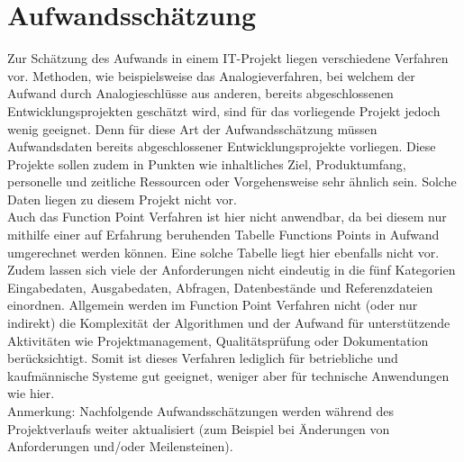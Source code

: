 \documentclass[../review_1.tex]{subfiles}
\begin{document}
\chapter{Aufwandsschätzung}\thispagestyle{fancy} %
Zur Schätzung des Aufwands in einem IT-Projekt liegen verschiedene Verfahren vor. Methoden, wie beispielsweise das Analogieverfahren, bei welchem der Aufwand durch Analogieschlüsse aus anderen, bereits abgeschlossenen Entwicklungsprojekten geschätzt wird, sind für das vorliegende Projekt jedoch wenig geeignet. Denn für diese Art der Aufwandsschätzung müssen Aufwandsdaten bereits abgeschlossener Entwicklungsprojekte vorliegen. Diese Projekte sollen zudem in Punkten wie inhaltliches Ziel, Produktumfang, personelle und zeitliche Ressourcen oder Vorgehensweise sehr ähnlich sein. Solche Daten liegen zu diesem Projekt nicht vor.\\
Auch das Function Point Verfahren ist hier nicht anwendbar, da bei diesem nur mithilfe einer auf Erfahrung beruhenden Tabelle Functions Points in Aufwand umgerechnet werden können. Eine solche Tabelle liegt hier ebenfalls nicht vor. Zudem lassen sich viele der Anforderungen nicht eindeutig in die fünf Kategorien \glqq Eingabedaten\grqq, \glqq Ausgabedaten\grqq, \glqq Abfragen\grqq, \glqq Datenbestände\grqq{} und \glqq Referenzdateien\grqq{} einordnen. Allgemein werden im Function Point Verfahren nicht (oder nur indirekt) die Komplexität der Algorithmen und der Aufwand für unterstützende Aktivitäten wie Projektmanagement, Qualitätsprüfung oder Dokumentation berücksichtigt. Somit ist dieses Verfahren lediglich für betriebliche und kaufmännische Systeme gut geeignet, weniger aber für technische Anwendungen wie hier.\\
Anmerkung: Nachfolgende Aufwandsschätzungen werden während des Projektverlaufs weiter aktualisiert (zum Beispiel bei Änderungen von Anforderungen und/oder Meilensteinen).
\end{document}
